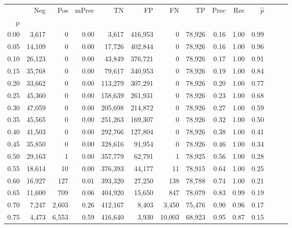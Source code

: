 \begin{tabular}{rrrrrrrrrrrrrr}
\toprule
{} &     Neg &     Pos & mPrec &       TN &       FP &      FN &      TP &  Prec &   Rec & $\hat{p}$ \\
p    &         &         &       &          &          &         &         &       &       &           \\
\midrule
0.00 &   3,617 &       0 &  0.00 &    3,617 &  416,953 &       0 &  78,926 &  0.16 &  1.00 &      0.99 \\
0.05 &  14,109 &       0 &  0.00 &   17,726 &  402,844 &       0 &  78,926 &  0.16 &  1.00 &      0.96 \\
0.10 &  26,123 &       0 &  0.00 &   43,849 &  376,721 &       0 &  78,926 &  0.17 &  1.00 &      0.91 \\
0.15 &  35,768 &       0 &  0.00 &   79,617 &  340,953 &       0 &  78,926 &  0.19 &  1.00 &      0.84 \\
0.20 &  33,662 &       0 &  0.00 &  113,279 &  307,291 &       0 &  78,926 &  0.20 &  1.00 &      0.77 \\
0.25 &  45,360 &       0 &  0.00 &  158,639 &  261,931 &       0 &  78,926 &  0.23 &  1.00 &      0.68 \\
0.30 &  47,059 &       0 &  0.00 &  205,698 &  214,872 &       0 &  78,926 &  0.27 &  1.00 &      0.59 \\
0.35 &  45,565 &       0 &  0.00 &  251,263 &  169,307 &       0 &  78,926 &  0.32 &  1.00 &      0.50 \\
0.40 &  41,503 &       0 &  0.00 &  292,766 &  127,804 &       0 &  78,926 &  0.38 &  1.00 &      0.41 \\
0.45 &  35,850 &       0 &  0.00 &  328,616 &   91,954 &       0 &  78,926 &  0.46 &  1.00 &      0.34 \\
0.50 &  29,163 &       1 &  0.00 &  357,779 &   62,791 &       1 &  78,925 &  0.56 &  1.00 &      0.28 \\
0.55 &  18,614 &      10 &  0.00 &  376,393 &   44,177 &      11 &  78,915 &  0.64 &  1.00 &      0.25 \\
0.60 &  16,927 &     127 &  0.01 &  393,320 &   27,250 &     138 &  78,788 &  0.74 &  1.00 &      0.21 \\
0.65 &  11,600 &     709 &  0.06 &  404,920 &   15,650 &     847 &  78,079 &  0.83 &  0.99 &      0.19 \\
0.70 &   7,247 &   2,603 &  0.26 &  412,167 &    8,403 &   3,450 &  75,476 &  0.90 &  0.96 &      0.17 \\
0.75 &   4,473 &   6,553 &  0.59 &  416,640 &    3,930 &  10,003 &  68,923 &  0.95 &  0.87 &      0.15 \\

\end{tabular}
